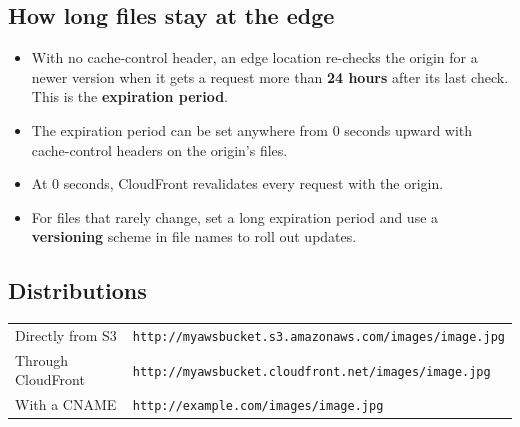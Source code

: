 \documentclass[11pt,a4paper]{article}
\begin{document}
\subsection{How long files stay at the edge}

\begin{itemize}\itemsep2pt
  \item With no cache-control header, an edge location re-checks the origin for a newer
        version when it gets a request more than \textbf{24 hours} after its last check.
        This is the \textbf{expiration period}.
  \item The expiration period can be set anywhere from 0 seconds upward with cache-control
        headers on the origin's files.
  \item At 0 seconds, CloudFront revalidates every request with the origin.
  \item For files that rarely change, set a long expiration period and use a
        \textbf{versioning} scheme in file names to roll out updates.
\end{itemize}

\subsection{Distributions}



\begin{tabularx}{\textwidth}{@{}lX@{}}
Directly from S3 & \texttt{http://myawsbucket.s3.amazonaws.com/images/image.jpg} \\
Through CloudFront & \texttt{http://myawsbucket.cloudfront.net/images/image.jpg} \\
With a CNAME & \texttt{http://example.com/images/image.jpg} \\
\end{tabularx}


\end{document}

